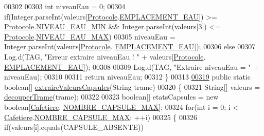 \begin{DoxyCode}
00302 
00303         \textcolor{keywordtype}{int} niveauEau = 0;
00304         \textcolor{keywordflow}{if}(Integer.parseInt(valeurs[\hyperlink{classcom_1_1example_1_1ekawa_1_1_protocole}{Protocole}.\hyperlink{classcom_1_1example_1_1ekawa_1_1_protocole_a2a6093ce136870c13b2ace7e46be9a5f}{EMPLACEMENT\_EAU}]) >= 
      \hyperlink{classcom_1_1example_1_1ekawa_1_1_protocole}{Protocole}.\hyperlink{classcom_1_1example_1_1ekawa_1_1_protocole_abba816d4dfe88be3a873669f2056aecc}{NIVEAU\_EAU\_MIN} && Integer.parseInt(valeurs[3]) <= 
      \hyperlink{classcom_1_1example_1_1ekawa_1_1_protocole}{Protocole}.\hyperlink{classcom_1_1example_1_1ekawa_1_1_protocole_a4318fa7c5638fd5da231029d1e2e9c99}{NIVEAU\_EAU\_MAX})
00305             niveauEau = Integer.parseInt(valeurs[\hyperlink{classcom_1_1example_1_1ekawa_1_1_protocole}{Protocole}.
      \hyperlink{classcom_1_1example_1_1ekawa_1_1_protocole_a2a6093ce136870c13b2ace7e46be9a5f}{EMPLACEMENT\_EAU}]);
00306         \textcolor{keywordflow}{else}
00307             Log.d(TAG, \textcolor{stringliteral}{"Erreur extraire niveauEau ! "} + valeurs[\hyperlink{classcom_1_1example_1_1ekawa_1_1_protocole}{Protocole}.
      \hyperlink{classcom_1_1example_1_1ekawa_1_1_protocole_a2a6093ce136870c13b2ace7e46be9a5f}{EMPLACEMENT\_EAU}]);
00308 
00309         Log.d(TAG, \textcolor{stringliteral}{"Extraire niveauEau = "} + niveauEau);
00310 
00311         \textcolor{keywordflow}{return} niveauEau;
00312     \}
00313 
\hyperlink{classcom_1_1example_1_1ekawa_1_1_protocole_ab9ea349bfe2b76585f8e71677cacd867}{00319}     \textcolor{keyword}{public} \textcolor{keyword}{static} \textcolor{keywordtype}{boolean}[] \hyperlink{classcom_1_1example_1_1ekawa_1_1_protocole_ab9ea349bfe2b76585f8e71677cacd867}{extraireValeursCapsules}(String trame)
00320     \{
00321         String[] valeurs = \hyperlink{classcom_1_1example_1_1ekawa_1_1_protocole_a23c261e4ab5ad3c2ac60187f04ae40ea}{decouperTrame}(trame);
00322 
00323         \textcolor{keywordtype}{boolean}[] etatsCapsules = \textcolor{keyword}{new} \textcolor{keywordtype}{boolean}[\hyperlink{classcom_1_1example_1_1ekawa_1_1_cafetiere}{Cafetiere}.
      \hyperlink{classcom_1_1example_1_1ekawa_1_1_cafetiere_a183d96e89c056c4ac9c565bf8f24851e}{NOMBRE\_CAPSULE\_MAX}];
00324         \textcolor{keywordflow}{for}(\textcolor{keywordtype}{int} i = 0; i < \hyperlink{classcom_1_1example_1_1ekawa_1_1_cafetiere}{Cafetiere}.\hyperlink{classcom_1_1example_1_1ekawa_1_1_cafetiere_a183d96e89c056c4ac9c565bf8f24851e}{NOMBRE\_CAPSULE\_MAX}; ++i)
00325         \{
00326             \textcolor{keywordflow}{if}(valeurs[i].equals(CAPSULE\_ABSENTE))

\end{DoxyCode}
